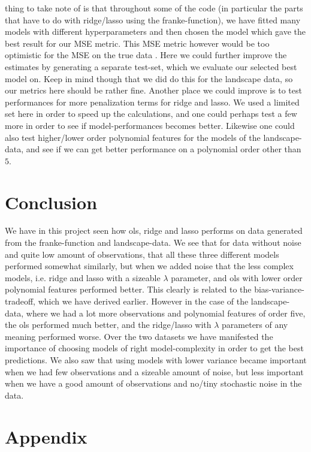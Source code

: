 \documentclass{article}
\begin{document}
thing to take note of is that throughout some of the code (in particular the
parts that have to do with ridge/lasso using the franke-function), we have
fitted many models with different hyperparameters and then chosen the model
which gave the best result for our MSE metric. This MSE metric however would be
too optimistic for the MSE on the true data \cite[s.~7.2]{hastie2009elements}.
Here we could further improve the estimates by generating a separate test-set,
which we evaluate our selected best model on.  Keep in mind though that we did
do this for the landscape data, so our metrics here should be rather fine.
Another place we could improve is to test performances for more penalization
terms for ridge and lasso. We used a limited set here in order to speed up the
calculations, and one could perhaps test a few more in order to see if
model-performances becomes better. Likewise one could also test higher/lower
order polynomial features for the models of the landscape-data, and see if we
can get better performance on a polynomial order other than $5$.

\section{Conclusion}
We have in this project seen how ols, ridge and lasso performs on data generated
from the franke-function and landscape-data. We see that for data without noise
and quite low amount of observations, that all these three different models
performed somewhat similarly, but when we added noise that the less
complex models, i.e. ridge and lasso with a sizeable $\lambda$ parameter,
and ols with lower order polynomial features performed better. This clearly is
related to the bias-variance-tradeoff, which we have derived earlier. However in
the case of the landscape-data, where we had a lot more observations and
polynomial features of order five, the ols performed much better, and the
ridge/lasso with $\lambda$ parameters of any meaning performed worse. Over the
two datasets we have manifested the importance of choosing models of right
model-complexity in order to get the best predictions. We also saw that using
models with lower variance became important when we had few observations and a
sizeable amount of noise, but less important when we have a good amount of
observations and no/tiny stochastic noise in the data.

\section{Appendix}
\end{document}
